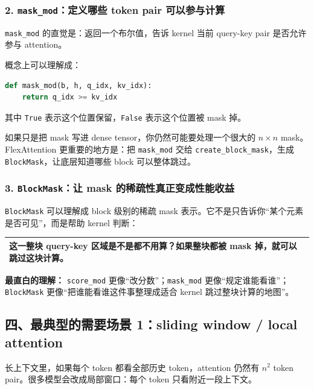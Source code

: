 \subsubsection*{2. \texttt{mask\_mod}：定义哪些 token pair 可以参与计算}

\texttt{mask\_mod} 的直觉是：返回一个布尔值，告诉 kernel 当前 query-key pair 是否允许参与 attention。

概念上可以理解成：

\begin{lstlisting}[language=Python]
def mask_mod(b, h, q_idx, kv_idx):
    return q_idx >= kv_idx
\end{lstlisting}

其中 \texttt{True} 表示这个位置保留，\texttt{False} 表示这个位置被 mask 掉。

如果只是把 mask 写进 dense tensor，你仍然可能要处理一个很大的 $n\times n$ mask。FlexAttention 更重要的地方是：把 \texttt{mask\_mod} 交给 \texttt{create\_block\_mask}，生成 \texttt{BlockMask}，让底层知道哪些 block 可以整体跳过。

\subsubsection*{3. \texttt{BlockMask}：让 mask 的稀疏性真正变成性能收益}

\texttt{BlockMask} 可以理解成 block 级别的稀疏 mask 表示。它不是只告诉你“某个元素是否可见”，而是帮助 kernel 判断：

\begin{center}
\begin{tabular}{p{13.2cm}}
\hline
这一整块 query-key 区域是不是都不用算？如果整块都被 mask 掉，就可以跳过这块计算。 \\
\hline
\end{tabular}
\end{center}

\begin{intubox}
\textbf{最直白的理解：} \texttt{score\_mod} 更像“改分数”；\texttt{mask\_mod} 更像“规定谁能看谁”；\texttt{BlockMask} 更像“把谁能看谁这件事整理成适合 kernel 跳过整块计算的地图”。
\end{intubox}

\subsection{四、最典型的需要场景 1：sliding window / local attention}

长上下文里，如果每个 token 都看全部历史 token，attention 仍然有 $n^2$ token pair。很多模型会改成局部窗口：每个 token 只看附近一段上下文。


